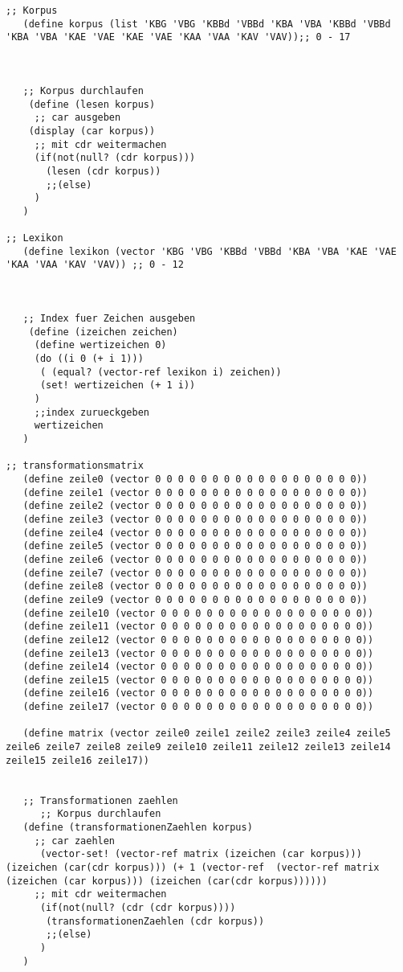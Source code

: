 \documentclass[12pt]{article}
\begin{document}
\begin{verbatim}
;; Korpus 
   (define korpus (list 'KBG 'VBG 'KBBd 'VBBd 'KBA 'VBA 'KBBd 'VBBd 'KBA 'VBA 'KAE 'VAE 'KAE 'VAE 'KAA 'VAA 'KAV 'VAV));; 0 - 17
   
   

   ;; Korpus durchlaufen  
    (define (lesen korpus)
     ;; car ausgeben
    (display (car korpus))
     ;; mit cdr weitermachen
     (if(not(null? (cdr korpus)))
       (lesen (cdr korpus))
       ;;(else)
     )
   )
   
;; Lexikon 
   (define lexikon (vector 'KBG 'VBG 'KBBd 'VBBd 'KBA 'VBA 'KAE 'VAE 'KAA 'VAA 'KAV 'VAV)) ;; 0 - 12 
   


   ;; Index fuer Zeichen ausgeben 
    (define (izeichen zeichen)
     (define wertizeichen 0)
     (do ((i 0 (+ i 1)))
      ( (equal? (vector-ref lexikon i) zeichen)) 
      (set! wertizeichen (+ 1 i))
     )
     ;;index zurueckgeben
     wertizeichen
   )
   
;; transformationsmatrix 
   (define zeile0 (vector 0 0 0 0 0 0 0 0 0 0 0 0 0 0 0 0 0 0))
   (define zeile1 (vector 0 0 0 0 0 0 0 0 0 0 0 0 0 0 0 0 0 0))
   (define zeile2 (vector 0 0 0 0 0 0 0 0 0 0 0 0 0 0 0 0 0 0))
   (define zeile3 (vector 0 0 0 0 0 0 0 0 0 0 0 0 0 0 0 0 0 0))
   (define zeile4 (vector 0 0 0 0 0 0 0 0 0 0 0 0 0 0 0 0 0 0))
   (define zeile5 (vector 0 0 0 0 0 0 0 0 0 0 0 0 0 0 0 0 0 0))
   (define zeile6 (vector 0 0 0 0 0 0 0 0 0 0 0 0 0 0 0 0 0 0))
   (define zeile7 (vector 0 0 0 0 0 0 0 0 0 0 0 0 0 0 0 0 0 0))
   (define zeile8 (vector 0 0 0 0 0 0 0 0 0 0 0 0 0 0 0 0 0 0))
   (define zeile9 (vector 0 0 0 0 0 0 0 0 0 0 0 0 0 0 0 0 0 0))
   (define zeile10 (vector 0 0 0 0 0 0 0 0 0 0 0 0 0 0 0 0 0 0))
   (define zeile11 (vector 0 0 0 0 0 0 0 0 0 0 0 0 0 0 0 0 0 0))
   (define zeile12 (vector 0 0 0 0 0 0 0 0 0 0 0 0 0 0 0 0 0 0))
   (define zeile13 (vector 0 0 0 0 0 0 0 0 0 0 0 0 0 0 0 0 0 0))
   (define zeile14 (vector 0 0 0 0 0 0 0 0 0 0 0 0 0 0 0 0 0 0))
   (define zeile15 (vector 0 0 0 0 0 0 0 0 0 0 0 0 0 0 0 0 0 0))
   (define zeile16 (vector 0 0 0 0 0 0 0 0 0 0 0 0 0 0 0 0 0 0))
   (define zeile17 (vector 0 0 0 0 0 0 0 0 0 0 0 0 0 0 0 0 0 0))
   
   (define matrix (vector zeile0 zeile1 zeile2 zeile3 zeile4 zeile5 zeile6 zeile7 zeile8 zeile9 zeile10 zeile11 zeile12 zeile13 zeile14 zeile15 zeile16 zeile17))
   
 
   ;; Transformationen zaehlen 
      ;; Korpus durchlaufen  
   (define (transformationenZaehlen korpus)
     ;; car zaehlen
      (vector-set! (vector-ref matrix (izeichen (car korpus))) (izeichen (car(cdr korpus))) (+ 1 (vector-ref  (vector-ref matrix (izeichen (car korpus))) (izeichen (car(cdr korpus))))))
     ;; mit cdr weitermachen
      (if(not(null? (cdr (cdr korpus))))
       (transformationenZaehlen (cdr korpus))
       ;;(else)
      )
   )


\end{verbatim}
\end{document}
